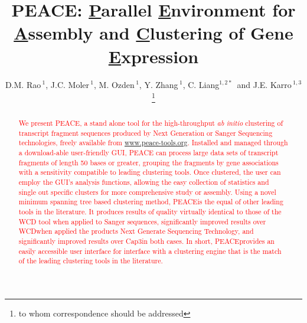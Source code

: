 \documentclass[a4,center,fleqn]{NAR}
\newcommand{\mc}[1]{\textcolor{red}{#1}}
\newcommand{\peace} {{\small PEACE}}
\newcommand{\wcd} {{\small WCD}}
\newcommand{\capthree} {{\small Cap3}}
\begin{document}
\title{PEACE: {\underline P}arallel {\underline E}nvironment for {\underline A}ssembly
  and {\underline C}lustering of Gene {\underline E}xpression}

\author{D.M. Rao\,$^{1}$, J.C. Moler\,$^{1}$, M. Ozden\,$^1$, Y. Zhang\,$^{1}$,
  C. Liang$^{1,2*}$\, and J.E. Karro\,$^{1,3}$\footnote{to whom
    correspondence should be addressed}}

\address{$^1$ Department of Computer Science and Software Engineering, \\
  $^2$ Department of Botany, \\
  $^3$ and Department of Microbiology, Miami University, Oxford, Ohio,
  USA}




\maketitle

\begin{abstract}
  \mc{We present \peace, a stand alone tool for the high-throughput
    {\it ab initio} clustering of transcript fragment sequences
    produced by Next Generation or Sanger Sequencing technologies,
    freely available from
    \href{http://www.peace-tools.org}{www.peace-tools.org}.  Installed
    and managed through a download-able user-friendly GUI, \peace\/ can
    process large data sets of transcript fragments of length 50 bases
    or greater, grouping the fragments by gene associations with a
    sensitivity compatible to leading clustering tools.  Once
    clustered, the user can employ the GUI's analysis functions,
    allowing the easy collection of statistics and single out specific
    clusters for more comprehensive study or assembly.  Using a novel
    minimum spanning tree based clustering method, \peace is the equal of
    other leading tools in the literature.  It produces results of
    quality virtually identical to those of the \wcd\/ tool when
    applied to Sanger sequences, significantly improved results over
    \wcd when applied the products Next Generate Sequencing
    Technology, and significantly improved results over \capthree in
    both cases.  In short, \peace provides an easily accessible user interface
    for interface with a clustering engine that is the match of the
    leading clustering tools in the literature.}




\end{abstract}
\end{document}
